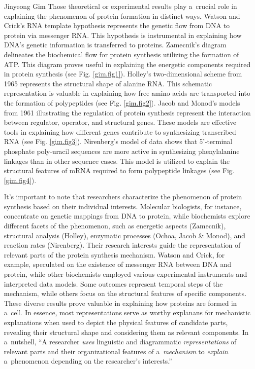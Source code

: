\begin{artengenv}{Jinyeong Gim}
Those theoretical or experimental results play a~crucial role in explaining the phenomenon of protein formation in distinct ways. Watson and Crick's RNA template hypothesis represents the genetic flow from DNA to protein via messenger RNA. This hypothesis is instrumental in explaining how DNA's genetic information is transferred to proteins. Zamecnik's diagram delineates the biochemical flow for protein synthesis utilizing the formation of ATP. This diagram proves useful in explaining the energetic components required in protein synthesis (see Fig. \ref{gim.fig1}). Holley's two-dimensional scheme from 1965 represents the structural shape of alanine RNA. This schematic representation is valuable in explaining how free amino acids are transported into the formation of polypeptides (see Fig. \ref{gim.fig2}). Jacob and Monod's models from 1961 illustrating the regulation of protein synthesis represent the interaction between regulator, operator, and structural genes. These models are effective tools in explaining how different genes contribute to synthesizing transcribed RNA (see Fig. \ref{gim.fig3}). Nirenberg's model of data shows that 5'-terminal phosphate poly-uracil sequences are more active in synthesizing phenylalanine linkages than in other sequence cases. This model is utilized to explain the structural features of mRNA required to form polypeptide linkages (see Fig. \ref{gim.fig4}).

It's important to note that researchers characterize the phenomenon of protein synthesis based on their individual interests. Molecular biologists, for instance, concentrate on genetic mappings from DNA to protein, while biochemists explore different facets of the phenomenon, such as energetic aspects (Zamecnik), structural analysis (Holley), enzymatic processes (Ochoa, Jacob \& Monod), and reaction rates (Nirenberg). Their research interests guide the representation of relevant parts of the protein synthesis mechanism. Watson and Crick, for example, speculated on the existence of messenger RNA between DNA and protein, while other biochemists employed various experimental instruments and interpreted data models. Some outcomes represent temporal steps of the mechanism, while others focus on the structural features of specific components. These diverse results prove valuable in explaining how proteins are formed in a~cell. In essence, most representations serve as worthy explanans for mechanistic explanations when used to depict the physical features of candidate parts, revealing their structural shape and considering them as relevant components. In a~nutshell, ``A researcher \textit{uses} linguistic and diagrammatic \textit{representations} of relevant parts and their organizational features of a~\textit{mechanism} to \textit{explain} a~phenomenon depending on the researcher's interests.''


\end{artengenv}
